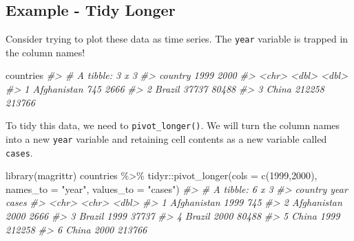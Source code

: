 \documentclass[
  12pt,
]{book}
\newenvironment{Shaded}{\begin{snugshade}}{\end{snugshade}}
\newcommand{\AttributeTok}[1]{\textcolor[rgb]{0.77,0.63,0.00}{#1}}
\newcommand{\CommentTok}[1]{\textcolor[rgb]{0.56,0.35,0.01}{\textit{#1}}}
\newcommand{\FunctionTok}[1]{\textcolor[rgb]{0.00,0.00,0.00}{#1}}
\newcommand{\NormalTok}[1]{#1}
\newcommand{\SpecialCharTok}[1]{\textcolor[rgb]{0.00,0.00,0.00}{#1}}
\newcommand{\StringTok}[1]{\textcolor[rgb]{0.31,0.60,0.02}{#1}}
\begin{document}
\hypertarget{example---tidy-longer}{%
\subsection{Example - Tidy Longer}\label{example---tidy-longer}}

Consider trying to plot these data as time series. The \texttt{year} variable is trapped in the column names!

\begin{Shaded}
\begin{Highlighting}[]
\NormalTok{countries}
\CommentTok{\#\textgreater{} \# A tibble: 3 x 3}
\CommentTok{\#\textgreater{}   country     \textasciigrave{}1999\textasciigrave{} \textasciigrave{}2000\textasciigrave{}}
\CommentTok{\#\textgreater{}   \textless{}chr\textgreater{}        \textless{}dbl\textgreater{}  \textless{}dbl\textgreater{}}
\CommentTok{\#\textgreater{} 1 Afghanistan    745   2666}
\CommentTok{\#\textgreater{} 2 Brazil       37737  80488}
\CommentTok{\#\textgreater{} 3 China       212258 213766}
\end{Highlighting}
\end{Shaded}

To tidy this data, we need to \texttt{pivot\_longer()}. We will turn the column names into a new \texttt{year} variable and retaining cell contents as a new variable called \texttt{cases}.

\begin{Shaded}
\begin{Highlighting}[]
\FunctionTok{library}\NormalTok{(magrittr)}
\NormalTok{countries }\SpecialCharTok{\%\textgreater{}\%} 
\NormalTok{  tidyr}\SpecialCharTok{::}\FunctionTok{pivot\_longer}\NormalTok{(}\AttributeTok{cols =} \FunctionTok{c}\NormalTok{(}\StringTok{\textasciigrave{}}\AttributeTok{1999}\StringTok{\textasciigrave{}}\NormalTok{,}\StringTok{\textasciigrave{}}\AttributeTok{2000}\StringTok{\textasciigrave{}}\NormalTok{), }\AttributeTok{names\_to =} \StringTok{"year"}\NormalTok{, }\AttributeTok{values\_to =} \StringTok{"cases"}\NormalTok{)}
\CommentTok{\#\textgreater{} \# A tibble: 6 x 3}
\CommentTok{\#\textgreater{}   country     year   cases}
\CommentTok{\#\textgreater{}   \textless{}chr\textgreater{}       \textless{}chr\textgreater{}  \textless{}dbl\textgreater{}}
\CommentTok{\#\textgreater{} 1 Afghanistan 1999     745}
\CommentTok{\#\textgreater{} 2 Afghanistan 2000    2666}
\CommentTok{\#\textgreater{} 3 Brazil      1999   37737}
\CommentTok{\#\textgreater{} 4 Brazil      2000   80488}
\CommentTok{\#\textgreater{} 5 China       1999  212258}
\CommentTok{\#\textgreater{} 6 China       2000  213766}
\end{Highlighting}
\end{Shaded}
\end{document}
